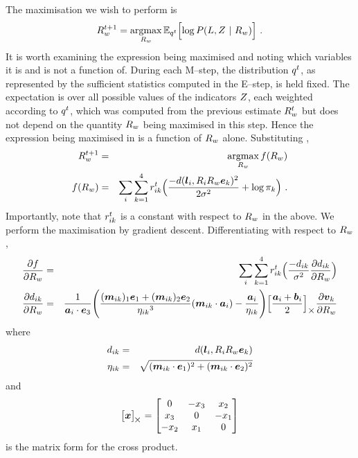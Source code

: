 The maximisation we wish to perform is
\begin{equation}
  \label{eq:R-argmax}
  \SceneR^{t+1} = \argmax_{\SceneR}\limits
  \Expected_{\PosteriorEst^t}\Bigl[
    \log P(\LineSegs,\Indicators ~|~ \SceneR) 
    \Bigr] ~.
\end{equation}
It is worth examining the expression being maximised and noting which
variables it is and is not a function of. During each M--step, the
distribution $\PosteriorEst^t$, as represented by the sufficient
statistics computed in the E--step, is held fixed. The expectation is
over all possible values of the indicators $\Indicators$, each
weighted according to $\PosteriorEst^t$, which was computed from the
previous estimate $\SceneR^t$ but does not depend on the quantity
$\SceneR$ being maximised in this step. Hence the expression being
maximised in  is a function of $\SceneR$ alone. Substituting
,
\begin{eqnarray}
  \SceneR^{t+1} &=& \argmax_{\SceneR}\limits \ErrorFunc(\SceneR) \\
  \ErrorFunc(\SceneR) 
  &=&
  \label{eq:R-error}
  \sum_i \sum_{k=1}^4
  \Resp_{ik}^t
  \Bigl(
  \frac{-\dist(\LineSeg_i, \CamR_i\SceneR\ebasis_k)^2}{2\sigma^2}
  + \log \Mixing_k
  \Bigr)~.
\end{eqnarray}
Importantly, note that $\Resp_{ik}^t$ is a constant with respect to
$\SceneR$ in the above. We perform the maximisation
 by gradient descent. Differentiating
 with respect to $\SceneR$,
\begin{eqnarray}
  \Deriv{\ErrorFunc}{\SceneR}
  &=&
  \sum_i \sum_{k=1}^4
  \Resp_{ik}^t
  \Bigl(
  \frac{-\dist_{ik}}{\sigma^2}
  \Deriv{\dist_{ik}}{\SceneR} 
  \Bigr)\\
  \Deriv{\dist_{ik}}{\SceneR} &=&
  \frac{1}{\StartPt_i \cdot \ez} 
  \Biggl(
  \frac
      {(\ReprojLine_{ik})_1\ex + (\ReprojLine_{ik})_2\ey}
      {{\eta_{ik}}^3}
      (\ReprojLine_{ik} \cdot \StartPt_i)
      -
      \frac{\StartPt_i}{\eta_{ik}}
      \Biggr)
      \Bigl[ \frac{\StartPt_i+\EndPt_i}{2} \Bigr]_{\cross}
      \Deriv{\vpt_k}{\SceneR}
\end{eqnarray} 
where
\begin{eqnarray}
  \dist_{ik} &=& \dist(\LineSeg_i, \CamR_i\SceneR\ebasis_k)\\
  \eta_{ik} &=&
  \sqrt{(\ReprojLine_{ik} \cdot \ex)^2 +
    (\ReprojLine_{ik} \cdot \ey)^2}
\end{eqnarray}
and
\begin{equation}
  \bigl[ \vect{x} \bigr]_{\!\cross} = 
  \begin{bmatrix}
    0 & -x_3 & x_2 \\
    x_3 & 0 & -x_1 \\
    -x_2 & x_1 & 0
  \end{bmatrix}
\end{equation}
is the matrix form for the cross product.

